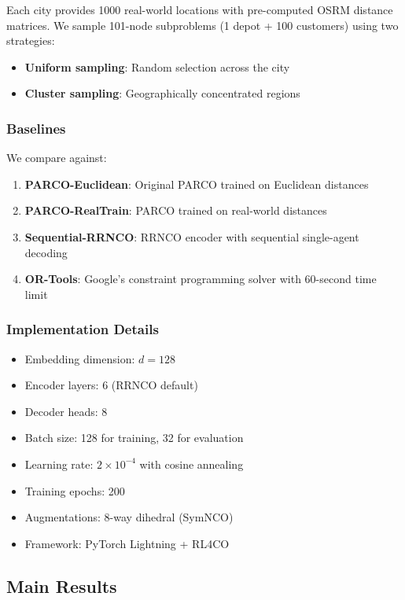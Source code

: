 \documentclass[lettersize,journal]{IEEEtran}
\begin{document}
Each city provides 1000 real-world locations with pre-computed OSRM distance matrices. We sample 101-node subproblems (1 depot + 100 customers) using two strategies:
\begin{itemize}
\item \textbf{Uniform sampling}: Random selection across the city
\item \textbf{Cluster sampling}: Geographically concentrated regions
\end{itemize}

\subsubsection{Baselines}

We compare against:
\begin{enumerate}
\item \textbf{PARCO-Euclidean}: Original PARCO trained on Euclidean distances
\item \textbf{PARCO-RealTrain}: PARCO trained on real-world distances
\item \textbf{Sequential-RRNCO}: RRNCO encoder with sequential single-agent decoding
\item \textbf{OR-Tools}: Google's constraint programming solver with 60-second time limit
\end{enumerate}

\subsubsection{Implementation Details}

\begin{itemize}
\item Embedding dimension: $d = 128$
\item Encoder layers: 6 (RRNCO default)
\item Decoder heads: 8
\item Batch size: 128 for training, 32 for evaluation
\item Learning rate: $2 \times 10^{-4}$ with cosine annealing
\item Training epochs: 200
\item Augmentations: 8-way dihedral (SymNCO)
\item Framework: PyTorch Lightning + RL4CO
\end{itemize}

\subsection{Main Results}
\end{document}
